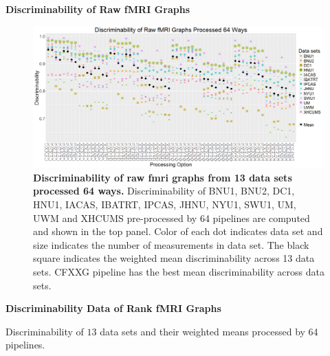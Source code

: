 \documentclass{article}
\begin{document}
\noindent\bf{Discriminability of Raw fMRI Graphs}
\begin{figure}[H]
	\includegraphics[width=\linewidth]{../Figs/fmri_raw.png}
	\caption{{\bf Discriminability of raw fmri graphs from 13 data sets processed 64 ways.}  Discriminability of BNU1, BNU2, DC1, HNU1, IACAS, IBATRT, IPCAS, JHNU, NYU1, SWU1, UM, UWM and XHCUMS pre-processed by 64 pipelines are computed and shown in the top panel. Color of each dot indicates data set and size indicates the number of measurements in data set. The black square indicates the weighted mean discriminability across 13 data sets. CFXXG pipeline has the best mean discriminability across data sets.}
	\label{fig:raw}
\end{figure}

\noindent\bf{Discriminability Data of Rank fMRI Graphs}
\begin{table}

\caption{Discriminability of $13$ data sets and their weighted means processed by 64 pipelines. }
\end{table}
\end{document}
